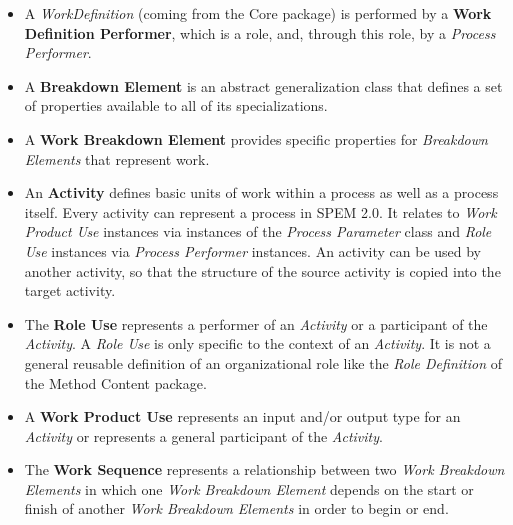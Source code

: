 \begin{itemize}

\item A \textit{WorkDefinition} (coming from the Core package) is performed by a \textbf{Work
Definition Performer}, which is a role, and, through this role, by a \textit{Process Performer}.

\item A \textbf{Breakdown Element} is an abstract generalization class that defines a set of
properties available to all of its specializations.

\item A \textbf{Work Breakdown Element} provides specific properties for \textit{Breakdown Elements}
that represent work.

\item An \textbf{Activity} defines basic units of work within a process as well as a process itself. Every activity can represent a process in SPEM 2.0. It relates to \textit{Work Product Use} instances via instances of the \textit{Process Parameter} class and \textit{Role Use} instances via \textit{Process Performer} instances. An activity can be used by another activity, so that the structure of the source activity is copied into the target activity.

\item The \textbf{Role Use} represents a performer of an \textit{Activity} or a participant of the \textit{Activity}. A \textit{Role Use} is only specific to the context of an \textit{Activity}. It is not a general reusable definition of an organizational role like the \textit{Role Definition} of the Method Content package. 

\item A \textbf{Work Product Use} represents an input and/or output type for an \textit{Activity} or
represents a general participant of the \textit{Activity}.

\item The \textbf{Work Sequence} represents a relationship between two \textit{Work Breakdown Elements} in which one \textit{Work Breakdown Element} depends on the start or finish of another \textit{Work Breakdown Elements} in order to begin or end.

\end{itemize}